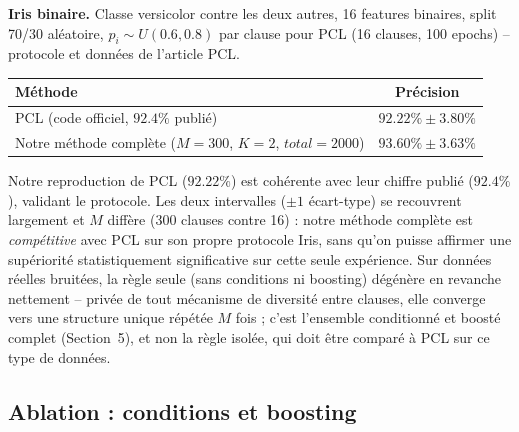 \documentclass[12pt,a4paper]{article}
\begin{document}
\textbf{Iris binaire.} Classe versicolor contre les deux autres, 16
features binaires, split 70/30 aléatoire, $p_i\sim U(0.6,0.8)$ par clause
pour PCL (16 clauses, 100 epochs) -- protocole et données de l'article PCL.
\begin{center}
\begin{tabular}{lc}
\toprule
Méthode & Précision \\
\midrule
PCL (code officiel, $92.4\%$ publié) & $92.22\%\pm3.80\%$ \\
Notre méthode complète ($M{=}300$, $K{=}2$, $total{=}2000$) & $93.60\%\pm3.63\%$ \\
\bottomrule
\end{tabular}
\end{center}
Notre reproduction de PCL ($92.22\%$) est cohérente avec leur chiffre
publié ($92.4\%$), validant le protocole. Les deux intervalles ($\pm1$
écart-type) se recouvrent largement et $M$ diffère (300 clauses contre 16) :
notre méthode complète est \emph{compétitive} avec PCL sur son propre
protocole Iris, sans qu'on puisse affirmer une supériorité statistiquement
significative sur cette seule expérience. Sur données réelles bruitées, la
règle seule (sans conditions ni boosting) dégénère en revanche nettement --
privée de tout mécanisme de diversité entre clauses, elle converge vers une
structure unique répétée $M$ fois ; c'est l'ensemble conditionné et boosté
complet (Section~5), et non la règle isolée, qui doit être comparé à PCL
sur ce type de données.

\subsection{Ablation : conditions et boosting}\label{sec:ablation}
\end{document}
